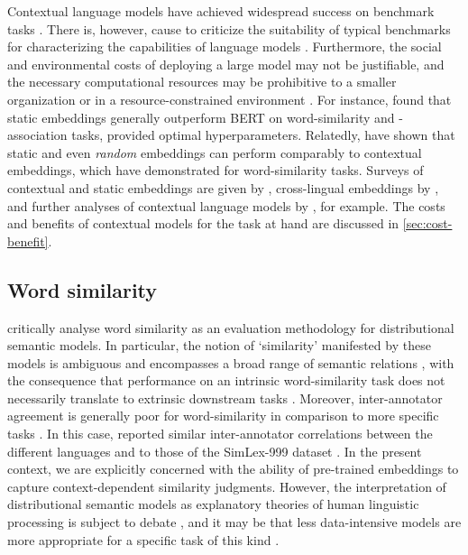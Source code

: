 Contextual language models have achieved widespread success on benchmark tasks
\parencites[22-27]{Bommasani2022}.
There is, however, cause to criticize the suitability of typical benchmarks for
characterizing the capabilities of language models \parencites[5-6]{Srivastava2023}.
Furthermore, the social and environmental costs of deploying a large model may not be
justifiable, and the necessary computational resources may be prohibitive to a smaller
organization or in a resource-constrained environment
\parencites[142-145,154]{Bommasani2022}.
For instance, \textcites{Lenci2022} found that static embeddings generally outperform
BERT \parencites{Devlin2019} on word-similarity and -association tasks, provided
optimal hyperparameters.
Relatedly, \textcites{Arora2020} have shown that static and even \emph{random}
embeddings can perform comparably to contextual embeddings, which
\textcites[5244-5246]{Gupta2019}[4760-4762]{Bommasani2020} have demonstrated for
word-similarity tasks.
Surveys of contextual and static embeddings are given by
\textcites{Liu2020}{Torregrossa2021}, cross-lingual embeddings by
\textcites{Ruder2019}, and further analyses of contextual language models by
\textcites{Reif2019}{Brunner2019}, for example.
The costs and benefits of contextual models for the task at hand are discussed in
\cref{sec:cost-benefit}.

\subsection{Word similarity}

\textcites{Batchkarov2016} critically analyse word similarity as an evaluation
methodology for distributional semantic models.
In particular, the notion of `similarity' manifested by these models is ambiguous
\parencites{Elekes2020} and encompasses a broad range of semantic relations
\parencites[2]{Pado2003}, with the consequence that performance on an intrinsic
word-similarity task does not necessarily translate to extrinsic downstream tasks
\parencites[7-8]{Batchkarov2016}.
Moreover, inter-annotator agreement is generally poor for word-similarity in comparison
to more specific tasks \parencites[8-9]{Batchkarov2016}.
In this case, \textcites[8]{Armendariz2020}[42]{Armendariz2020a} reported similar
inter-annotator correlations between the different languages and to those of the
SimLex-999 dataset \parencites[678-680]{Hill2015}.
In the present context, we are explicitly concerned with the ability of pre-trained
embeddings to capture context-dependent similarity judgments.
However, the interpretation of distributional semantic models as explanatory theories
of human linguistic processing is subject to debate
\parencites{Gunther2019}{Westera2019}, and it may be that less data-intensive models
are more appropriate for a specific task of this kind \parencites{DeDeyne2016}.
